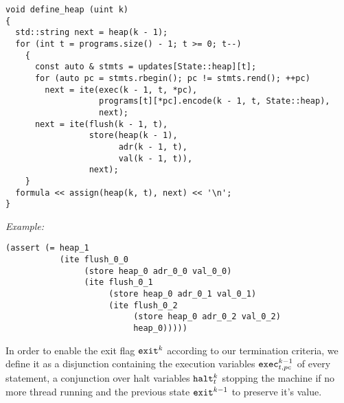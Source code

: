 \begin{lstlisting}[style=c++]
void define_heap (uint k)
{
  std::string next = heap(k - 1);
  for (int t = programs.size() - 1; t >= 0; t--)
    {
      const auto & stmts = updates[State::heap][t];
      for (auto pc = stmts.rbegin(); pc != stmts.rend(); ++pc)
        next = ite(exec(k - 1, t, *pc),
                   programs[t][*pc].encode(k - 1, t, State::heap),
                   next);
      next = ite(flush(k - 1, t),
                 store(heap(k - 1),
                       adr(k - 1, t),
                       val(k - 1, t)),
                 next);
    }
  formula << assign(heap(k, t), next) << '\n';
}
\end{lstlisting}

\newpage

\noindent
\emph{Example:} 

\begin{lstlisting}[style=smtlib]
(assert (= heap_1
           (ite flush_0_0
                (store heap_0 adr_0_0 val_0_0)
                (ite flush_0_1
                     (store heap_0 adr_0_1 val_0_1)
                     (ite flush_0_2
                          (store heap_0 adr_0_2 val_0_2)
                          heap_0)))))
\end{lstlisting}


%
%
%
%

\noindent
In order to enable the exit flag $\texttt{exit}^k$ according to our termination criteria, we define it as a disjunction containing the execution variables $\texttt{exec}^{k - 1}_{t, pc}$ of every  statement, a conjunction over  halt variables $\texttt{halt}^k_t$  stopping the machine if no more thread running and the previous state $\texttt{exit}^{k - 1}$ to preserve it's value.

